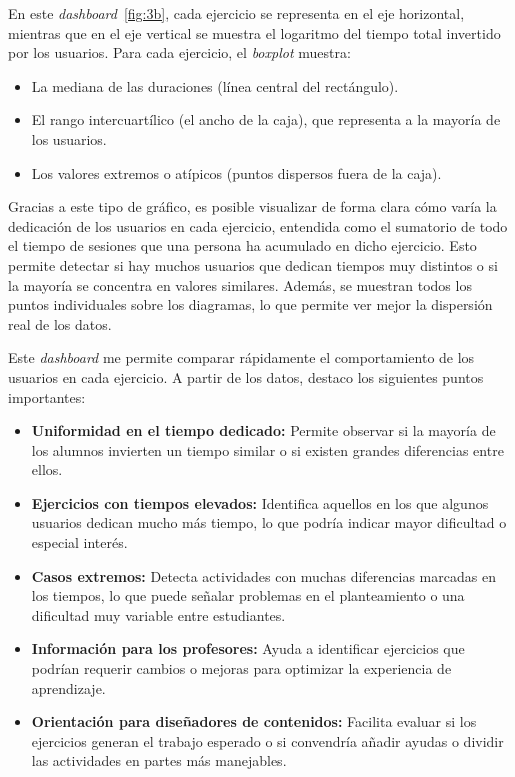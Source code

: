 \documentclass[a4paper, 12pt]{book}
\begin{document}
En este \textit{dashboard}~\ref{fig:3b}, cada ejercicio se representa en el eje horizontal, mientras que en el eje vertical se muestra el logaritmo del tiempo total invertido por los usuarios. Para cada ejercicio, el \textit{boxplot} muestra:

\begin{itemize}
  \item La mediana de las duraciones (línea central del rectángulo).
  \item El rango intercuartílico (el ancho de la caja), que representa a la mayoría de los usuarios.
  \item Los valores extremos o atípicos (puntos dispersos fuera de la caja).
\end{itemize}

Gracias a este tipo de gráfico, es posible visualizar de forma clara cómo varía la dedicación de los usuarios en cada ejercicio, entendida como el sumatorio de todo el tiempo de sesiones que una persona ha acumulado en dicho ejercicio. Esto permite detectar si hay muchos usuarios que dedican tiempos muy distintos o si la mayoría se concentra en valores similares. Además, se muestran todos los puntos individuales sobre los diagramas, lo que permite ver mejor la dispersión real de los datos.

Este \textit{dashboard} me permite comparar rápidamente el comportamiento de los usuarios en cada ejercicio. A partir de los datos, destaco los siguientes puntos importantes:

\begin{itemize}
  \item \textbf{Uniformidad en el tiempo dedicado:} Permite observar si la mayoría de los alumnos invierten un tiempo similar o si existen grandes diferencias entre ellos.

  \item \textbf{Ejercicios con tiempos elevados:} Identifica aquellos en los que algunos usuarios dedican mucho más tiempo, lo que podría indicar mayor dificultad o especial interés.

  \item \textbf{Casos extremos:} Detecta actividades con muchas diferencias marcadas en los tiempos, lo que puede señalar problemas en el planteamiento o una dificultad muy variable entre estudiantes.

  \item \textbf{Información para los profesores:} Ayuda a identificar ejercicios que podrían requerir cambios o mejoras para optimizar la experiencia de aprendizaje.

  \item \textbf{Orientación para diseñadores de contenidos:} Facilita evaluar si los ejercicios generan el trabajo esperado o si convendría añadir ayudas o dividir las actividades en partes más manejables.
\end{itemize}
\end{document}
